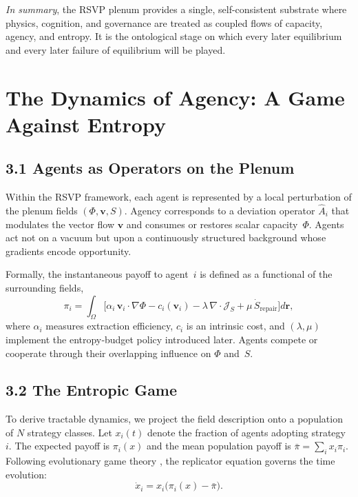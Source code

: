 \documentclass[11pt,a4paper,titlepage]{article}
\theoremstyle{definition}
\begin{document}
\bigskip
\noindent
\textit{In summary}, the RSVP plenum provides a single,
self-consistent substrate where physics, cognition, and governance are treated
as coupled flows of capacity, agency, and entropy.  It is the ontological stage
on which every later equilibrium and every later failure of equilibrium will
be played.

\section{The Dynamics of Agency: A Game Against Entropy}
\label{sec:agency}

\subsection{3.1 Agents as Operators on the Plenum}

Within the RSVP framework, each agent is represented by a local perturbation of
the plenum fields $(\Phi,\mathbf{v},S)$.  Agency corresponds to a deviation
operator $\hat{A}_i$ that modulates the vector flow $\mathbf{v}$ and consumes
or restores scalar capacity~$\Phi$.  Agents act not on a vacuum but upon a
continuously structured background whose gradients encode opportunity.

Formally, the instantaneous payoff to agent~$i$ is defined as a functional of
the surrounding fields,
\begin{equation}
\pi_i = \int_\Omega \big[
  \alpha_i \, \mathbf{v}_i\!\cdot\!\nabla\Phi
  - c_i(\mathbf{v}_i)
  - \lambda\, \nabla\!\cdot\mathcal{J}_S
  + \mu\, \dot{S}_{\text{repair}}
\big] d\mathbf{r},
\label{eq:payoff_field}
\end{equation}
where $\alpha_i$ measures extraction efficiency,
$c_i$ is an intrinsic cost,
and $(\lambda,\mu)$ implement the entropy‐budget policy introduced later.
Agents compete or cooperate through their overlapping influence on $\Phi$ and~$S$.

\subsection{3.2 The Entropic Game}

To derive tractable dynamics, we project the field description
onto a population of $N$ strategy classes.
Let $x_i(t)$ denote the fraction of agents adopting strategy~$i$.
The expected payoff is $\pi_i(x)$ and the mean population payoff is
$\bar{\pi}=\sum_i x_i\pi_i$.
Following evolutionary game theory \cite{smith1973,smith1982,hofbauer1998},
the replicator equation governs the time evolution:
\begin{equation}
\dot{x}_i = x_i \big(\pi_i(x) - \bar{\pi}\big).
\label{eq:replicator}
\end{equation}
\end{document}
